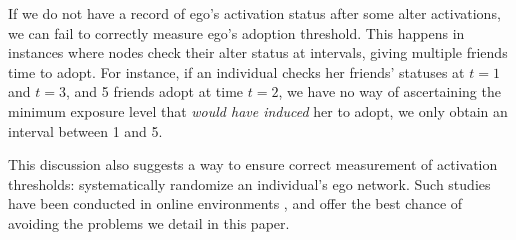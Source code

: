 \documentclass[a4paper]{article}
\begin{document}
If we do not have a record of ego's activation status after some alter activations, we can fail to correctly measure ego's adoption threshold. This happens in instances where nodes check their alter status at intervals, giving multiple friends time to adopt. For instance, if an individual checks her friends' statuses at $t = 1$ and $t = 3$, and 5 friends adopt at time $t = 2$, we have no way of ascertaining the minimum exposure level that \emph{would have induced} her to adopt, we only obtain an interval between 1 and 5.

This discussion also suggests a way to ensure correct measurement of activation thresholds: systematically randomize an individual's ego network. Such studies have been conducted in online environments \parencite{Aral2008, Bakshy2011}, and offer the best chance of avoiding the problems we detail in this paper.
\end{document}
